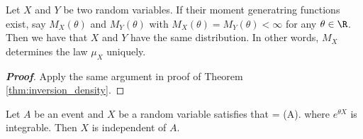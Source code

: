 




\begin{theorem}\label{thm:mgf_uniquely_determine_law}
Let $X$ and $Y$ be two random variables. If their moment generatring functions exist, say $M_X(\theta)$ and $M_Y(\theta)$ with $M_X(\theta) =M_Y(\theta) < \infty$ for any $\theta \in \R$. Then we have that $X$ and $Y$ have the same distribution. In other words, $M_X$ determines the law $\mu_X$ uniquely.
\end{theorem}

\begin{proof}[\bf Proof]
Apply the same argument in proof of Theorem \ref{thm:inversion_density}.
\end{proof}

\begin{corollary}\label{cor:mgf_indicator_expectation_independent}
Let $A$ be an event and $X$ be a random variable satisfies that
\be
\E{} = \E{}\pro(A).
\ee
where $e^{\theta X}$ is integrable. Then $X$ is independent of $A$.
\end{corollary}

